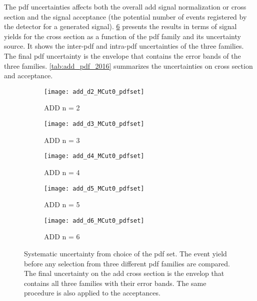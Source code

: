 The \gls{pdf} uncertainties affects both the overall \gls{add} signal
normalization or cross section and the signal acceptance (the potential number
of events registered by the detector for a generated
signal). \cref{fig:pdf_syst} presents the results in terms of signal yields for
the cross section as a function of the \gls{pdf} family and its uncertainty
source. It shows the inter-\gls{pdf} and intra-\gls{pdf} uncertainties of the
three families. The final \gls{pdf} uncertainty is the envelope that contains
the error bands of the three families. \cref{tab:add_pdf_2016} summarizes the
uncertainties on cross section and acceptance.
\begin{figure}[!h]
  \centering
  \begin{subfigure}{.48\linewidth}
    \texttt{[image: add\_d2\_MCut0\_pdfset]}
    \caption{ADD n = 2}
    \label{fig:pdf_n2}
  \end{subfigure}
  \begin{subfigure}{.48\linewidth}
    \texttt{[image: add\_d3\_MCut0\_pdfset]}
    \caption{ADD n = 3}
    \label{fig:pdf_n3}
  \end{subfigure}
  \begin{subfigure}{.48\linewidth}
    \texttt{[image: add\_d4\_MCut0\_pdfset]}
    \caption{ADD n = 4}
    \label{fig:pdf_n4}
  \end{subfigure}
  \begin{subfigure}{.48\linewidth}
    \texttt{[image: add\_d5\_MCut0\_pdfset]}
    \caption{ADD n = 5}
    \label{fig:pdf_n5}
  \end{subfigure}
  \begin{subfigure}{.48\linewidth}
    \texttt{[image: add\_d6\_MCut0\_pdfset]}
    \caption{ADD n = 6}
    \label{fig:pdf_n6}
  \end{subfigure}
  \caption{Systematic uncertainty from choice of the \gls{pdf} set. The event
    yield before any selection from three different \gls{pdf} families are
    compared. The final uncertainty on the \gls{add} cross section is the
    envelop that contains all three families with their error bands. The same
    procedure is also applied to the acceptances.}
  \label{fig:pdf_syst}
\end{figure}

